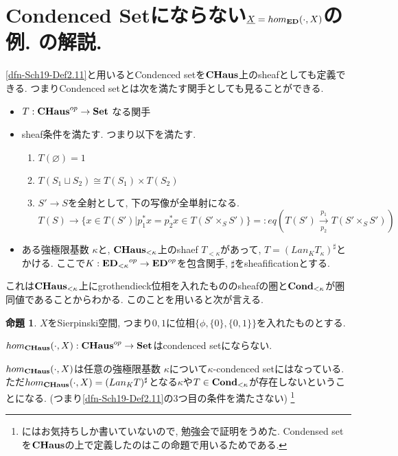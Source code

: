 \documentclass[dvipdfmx,a4paper,11pt]{article}
\theoremstyle{definition}
\newtheorem{prop}[thm]{命題}
\begin{document}
\section{Condenced Setにならない$\underline{X} = hom_{{\bf ED}}(\cdot, X)$の例. \cite[Warning 2.14]{Sch19}の解説.}
\ref{dfn-Sch19-Def2.11}と用いるとCondenced setを${\bf CHaus}$上のsheafとしても定義できる. 
つまりCondenced setとは次を満たす関手としても見ることができる. 
\begin{itemize}
\item $T : {\bf CHaus}^{op} \to {\bf Set}$ なる関手
\item sheaf条件を満たす. 
つまり以下を満たす.
\begin{enumerate}
\item $T(\varnothing)=1$ 
\item $T(S_1\sqcup S_2) \cong T(S_1) \times T(S_2)$
\item $S' \to S$を全射として, 下の写像が全単射になる.
$$T(S) \to \{ x \in T(S') | p_{1}^{*}x = p_{2}^{*}x \in T(S' \times_S S')\}
=:eq(T(S') \underset{p_2}{\overset{p_1}{\to}}T(S' \times_S S'))
$$
\end{enumerate}
\item ある強極限基数 $\kappa$と, ${\bf CHaus}_{< \kappa}$上のshaef $T_{< \kappa}$があって, $T = (Lan_{K}T_{\kappa})^{\sharp}$とかける. ここで$K : {{\bf ED}_{<\kappa}}^{op} \to {\bf ED}^{op}$を包含関手, $\sharp$をsheafificationとする. 
\end{itemize}

これは${ \bf CHaus}_{< \kappa}$上にgrothendieck位相を入れたもののsheafの圏と${\bf  Cond}_{< \kappa}$が圏同値であることからわかる. 
このことを用いると次が言える. 

\begin{tcolorbox}
 [colback = white, colframe = green!35!black, fonttitle = \bfseries,breakable = true]
\begin{prop}\cite[Warning 2.14]{Sch19}
$X$をSierpinski空間, つまり${0,1}$に位相$\{\phi, \{0\}, \{0,1\} \}$を入れたものとする.

$hom_{{\bf CHaus}}(\cdot,  X) :{\bf CHaus}^{op} \to{\bf Set} $はcondenced setにならない.
\end{prop}
 \end{tcolorbox}
 
 $hom_{{\bf CHaus}}(\cdot,  X)$は任意の強極限基数
 $\kappa$について$\kappa$-condenced setにはなっている. 
 ただ$hom_{{\bf CHaus}}(\cdot,  X) =  (Lan_{K}T)^{\sharp}$となる$\kappa$や$T \in {\bf Cond}_{< \kappa}$が存在しないということになる. (つまり\ref{dfn-Sch19-Def2.11}の3つ目の条件を満たさない)
 \footnote{\cite[Warning 2.14]{Sch19}にはお気持ちしか書いていないので, 勉強会で証明をうめた. Condensed setを${\bf CHaus}$の上で定義したのはこの命題で用いるためである.}
 
\end{document}
